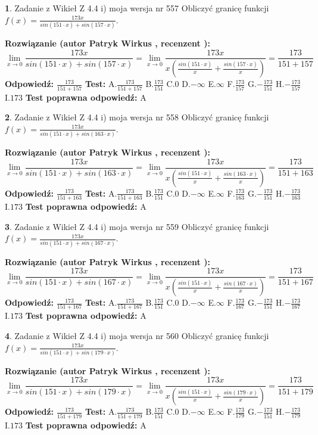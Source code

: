 \documentclass[12pt, a4paper]{article}
\theoremstyle{definition} %
\newtheorem{zad}{}
\newcommand{\zadStart}[1]{\begin{zad}#1\newline}
\newcommand{\zadStop}{\end{zad}}
\newcommand{\rozwStart}[2]{\noindent \textbf{Rozwiązanie (autor #1 , recenzent #2): }\newline}
\newcommand{\rozwStop}{\newline}
\newcommand{\odpStart}{\noindent \textbf{Odpowiedź:}\newline}
\newcommand{\odpStop}{\newline}
\newcommand{\testStart}{\noindent \textbf{Test:}\newline}
\newcommand{\testStop}{\newline}
\newcommand{\kluczStart}{\noindent \textbf{Test poprawna odpowiedź:}\newline}
\newcommand{\kluczStop}{\newline}
\begin{document}
\zadStart{Zadanie z Wikieł Z 4.4 i) moja wersja nr 557}
Obliczyć granicę funkcji $f(x)=\frac{173x}{sin(151\cdot x) +sin(157\cdot x)}$.
\zadStop
\rozwStart{Patryk Wirkus}{}
$$\lim\limits_{x\to 0}\frac{173x}{sin(151\cdot x) +sin(157\cdot x)}=\lim\limits_{x\to 0}\frac{173x}{x(\frac{sin(151\cdot x)}{x}+\frac{sin(157\cdot x)}{x})}=\frac{173}{151+157}$$
\rozwStop
\odpStart
$\frac{173}{151+157}$
\odpStop
\testStart
A.$\frac{173}{151+157}$
B.$\frac{173}{151}$
C.$0$
D.$-\infty$
E.$\infty$
F.$\frac{173}{157}$
G.$-\frac{173}{151}$
H.$-\frac{173}{157}$
I.$173$
\testStop
\kluczStart
A
\kluczStop



\zadStart{Zadanie z Wikieł Z 4.4 i) moja wersja nr 558}
Obliczyć granicę funkcji $f(x)=\frac{173x}{sin(151\cdot x) +sin(163\cdot x)}$.
\zadStop
\rozwStart{Patryk Wirkus}{}
$$\lim\limits_{x\to 0}\frac{173x}{sin(151\cdot x) +sin(163\cdot x)}=\lim\limits_{x\to 0}\frac{173x}{x(\frac{sin(151\cdot x)}{x}+\frac{sin(163\cdot x)}{x})}=\frac{173}{151+163}$$
\rozwStop
\odpStart
$\frac{173}{151+163}$
\odpStop
\testStart
A.$\frac{173}{151+163}$
B.$\frac{173}{151}$
C.$0$
D.$-\infty$
E.$\infty$
F.$\frac{173}{163}$
G.$-\frac{173}{151}$
H.$-\frac{173}{163}$
I.$173$
\testStop
\kluczStart
A
\kluczStop



\zadStart{Zadanie z Wikieł Z 4.4 i) moja wersja nr 559}
Obliczyć granicę funkcji $f(x)=\frac{173x}{sin(151\cdot x) +sin(167\cdot x)}$.
\zadStop
\rozwStart{Patryk Wirkus}{}
$$\lim\limits_{x\to 0}\frac{173x}{sin(151\cdot x) +sin(167\cdot x)}=\lim\limits_{x\to 0}\frac{173x}{x(\frac{sin(151\cdot x)}{x}+\frac{sin(167\cdot x)}{x})}=\frac{173}{151+167}$$
\rozwStop
\odpStart
$\frac{173}{151+167}$
\odpStop
\testStart
A.$\frac{173}{151+167}$
B.$\frac{173}{151}$
C.$0$
D.$-\infty$
E.$\infty$
F.$\frac{173}{167}$
G.$-\frac{173}{151}$
H.$-\frac{173}{167}$
I.$173$
\testStop
\kluczStart
A
\kluczStop



\zadStart{Zadanie z Wikieł Z 4.4 i) moja wersja nr 560}
Obliczyć granicę funkcji $f(x)=\frac{173x}{sin(151\cdot x) +sin(179\cdot x)}$.
\zadStop
\rozwStart{Patryk Wirkus}{}
$$\lim\limits_{x\to 0}\frac{173x}{sin(151\cdot x) +sin(179\cdot x)}=\lim\limits_{x\to 0}\frac{173x}{x(\frac{sin(151\cdot x)}{x}+\frac{sin(179\cdot x)}{x})}=\frac{173}{151+179}$$
\rozwStop
\odpStart
$\frac{173}{151+179}$
\odpStop
\testStart
A.$\frac{173}{151+179}$
B.$\frac{173}{151}$
C.$0$
D.$-\infty$
E.$\infty$
F.$\frac{173}{179}$
G.$-\frac{173}{151}$
H.$-\frac{173}{179}$
I.$173$
\testStop
\kluczStart
A
\kluczStop
\end{document}
